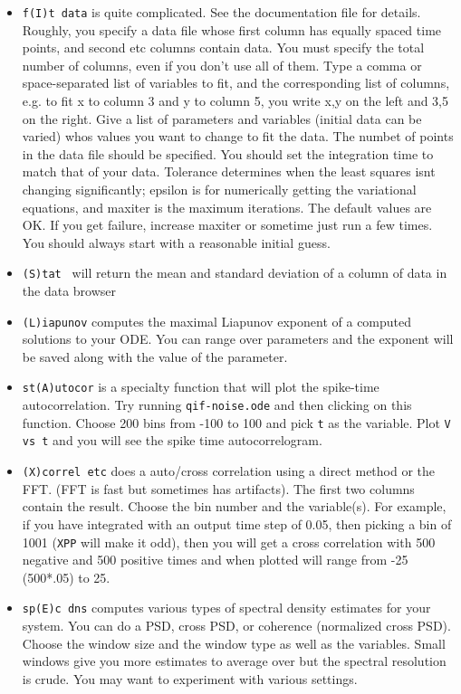 \documentclass{article}
\begin{document}
\begin{itemize}
\begin{itemize}
\item {\tt f(I)t data} is quite complicated. See the documentation file for details. Roughly, you specify a data file whose first column has equally spaced time points, and second etc columns contain data. You must specify the total number of columns, even if you don't use all of them.  Type a comma or space-separated list of variables to fit, and the corresponding list of columns, e.g. to fit x to column 3 and y to column 5, you write x,y on the left and 3,5 on the right. Give a list of parameters and variables (initial data can be varied) whos values you want to change to fit the data.  The numbet of points in the data file should be specified. You should set the integration time to match that of your data.  Tolerance determines when the least squares isnt changing significantly; epsilon is for numerically getting the variational equations, and maxiter is the maximum iterations. The default values are OK. If you get failure, increase maxiter or sometime just run a few times. You should always start with a reasonable initial guess.
\item {\tt (S)tat } will return the mean and standard deviation of a column of data in the data browser
\item {\tt (L)iapunov} computes the maximal Liapunov exponent of a computed solutions to your ODE. You can range over parameters and the exponent will be saved along with the value of the parameter.
\item {\tt st(A)utocor} is a specialty function that will plot the spike-time autocorrelation. Try running {\tt qif-noise.ode} and then clicking on this function. Choose 200 bins from -100 to 100 and pick {\tt t} as the variable. Plot {\tt V vs t} and you will see the spike time autocorrelogram. 
\item {\tt (X)correl etc} does a auto/cross correlation using a direct method or the FFT. (FFT is fast but sometimes has artifacts). The first two columns contain the result. Choose the bin number and the variable(s). For example, if you have integrated with an output time step of 0.05, then picking a bin of 1001 ({\tt XPP} will make it odd), then you will get a cross correlation with 500 negative and 500 positive times and when plotted will range from -25 (500*.05) to 25.
\item {\tt sp(E)c dns} computes various types of spectral density estimates for your system. You can do a PSD, cross PSD, or coherence (normalized cross PSD). Choose the window size and the window type as well as the variables. Small windows give you more estimates to average over but the spectral resolution is crude.  You may want to experiment with various settings.

\end{itemize}
\end{itemize}
\end{document}
